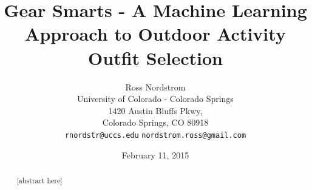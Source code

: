 \documentclass{sig-alternate}
\begin{document}
\title{Gear Smarts - A Machine Learning Approach to Outdoor Activity Outfit Selection}
\author{Ross Nordstrom\\
        University of Colorado - Colorado Springs\\
        1420 Austin Bluffs Pkwy,\\
        Colorado Springs, CO 80918\\
        \texttt{rnordstr@uccs.edu}
        \texttt{nordstrom.ross@gmail.com}
       }
\date{February 11, 2015}

\maketitle

\begin{abstract}
   [abstract here]
\end{abstract}










{}

\end{document}
